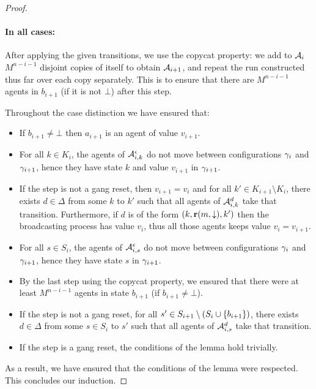 \begin{proof}
\paragraph{In all cases:} After applying the given transitions, we use the copycat property: we add to $\mathcal{A}_i$ $M^{n-i-1}$ disjoint copies of itself to obtain $\mathcal{A}_{i+1}$, and repeat the run constructed thus far over each copy separately. This is to ensure that there are $M^{n-i-1}$ agents in $b_{i+1}$ (if it is not $\bot$) after this step.

Throughout the case distinction we have ensured that:
\begin{itemize}
	\item If $b_{i+1} \neq \bot$ then $a_{i+1}$ is an agent of value $v_{i+1}$.
	
	\item For all $k \in K_{i}$, the agents of $\mathcal{A}_{i,k}^\epsilon$ do not move between configurations $\gamma_{i}$ and $\gamma_{i+1}$, hence they have state $k$ and value $v_{i+1}$ in $\gamma_{i+1}$.
	
	\item If the step is not a gang reset, then $v_{i+1} = v_i$ and for all $k' \in K_{i+1} \setminus K_i$, there exists $d \in \Delta$ from some $k$ to $k'$ such that all agents of $\mathcal{A}_{i,k}^d$ take that transition. Furthermore, if $d$ is of the form $(k,\textbf{r}(m, \downarrow),k')$ then the broadcasting process has value $v_i$, thus all those agents keeps value $v_i = v_{i+1}$. 
	
	\item For all $s \in S_{i}$, the agents of $\mathcal{A}_{i,s}^\epsilon$ do not move between configurations $\gamma_{i}$ and $\gamma_{i+1}$, hence they have state $s$ in $\gamma_{i+1}$.
	
	\item By the last step using the copycat property, we ensured that there were at least $M^{n-i-1}$ agents in state $b_{i+1}$ (if $b_{i+1} \neq \bot$).
	
	\item If the step is not a gang reset, for all $s' \in S_{i+1} \setminus (S_i \cup \{b_{i+1}\})$, there exists $d \in \Delta$ from some $s \in S_i$ to $s'$ such that all agents of $\mathcal{A}_{i,s}^d$ take that transition.
	
	\item If the step is a gang reset, the conditions of the lemma hold trivially.
\end{itemize}

As a result, we have ensured that the conditions of the lemma were respected.
This concludes our induction.
\end{proof}


